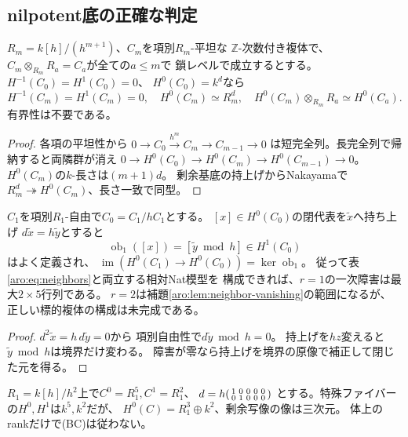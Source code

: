 \subsection{nilpotent底の正確な判定}
\begin{lemma}[隣接群消滅による自由な持上げ]\label{aro:lem:neighbor-vanishing}
$R_m=k[h]/(h^{m+1})$、$C_m$を項別$R_m$-平坦な
$\mathbb Z$-次数付き複体で、
$C_m\otimes_{R_m}R_a=C_a$が全ての$a\le m$で
鎖レベルで成立するとする。
$H^{-1}(C_0)=H^1(C_0)=0$、
$H^0(C_0)=k^d$なら
\[
H^{-1}(C_m)=H^1(C_m)=0,\quad
H^0(C_m)\simeq R_m^d,\quad
H^0(C_m)\otimes_{R_m}R_a\simeq H^0(C_a).
\tag{ARO3}\label{aro:eq:flat}
\]
有界性は不要である。
\end{lemma}
\begin{proof}
各項の平坦性から
$0\to C_0\xrightarrow{h^m}C_m\to C_{m-1}\to0$
は短完全列。長完全列で帰納すると両隣群が消え
$0\to H^0(C_0)\to H^0(C_m)\to H^0(C_{m-1})\to0$。
$H^0(C_m)$の$k$-長さは$(m+1)d$。
剰余基底の持上げからNakayamaで
$R_m^d\twoheadrightarrow H^0(C_m)$、長さ一致で同型。
\end{proof}

\begin{proposition}[次数一の最初の障害行列]\label{aro:prop:first-obstruction}
$C_1$を項別$R_1$-自由で$C_0=C_1/hC_1$とする。
$[x]\in H^0(C_0)$の閉代表を$\widetilde x$へ持ち上げ
$d\widetilde x=h\widetilde y$とすると
\[
\operatorname{ob}_1([x])
=[\widetilde y\bmod h]\in H^1(C_0)
\tag{ARO4}\label{aro:eq:obstruction}
\]
はよく定義され、
$\operatorname{im}(H^0(C_1)\to H^0(C_0))
=\ker\operatorname{ob}_1$。
従って表\eqref{aro:eq:neighbors}と両立する相対Nat模型を
構成できれば、$r=1$の一次障害は最大$2\times5$行列である。
$r=2$は補題\ref{aro:lem:neighbor-vanishing}の範囲になるが、
正しい標的複体の構成は未完成である。
\end{proposition}
\begin{proof}
$d^2\widetilde x=h\,d\widetilde y=0$から
項別自由性で$d\widetilde y\bmod h=0$。
持上げを$hz$変えると$\widetilde y\bmod h$は境界だけ変わる。
障害が零なら持上げを境界の原像で補正して閉じた元を得る。
\end{proof}
\begin{example}[非零障害]\label{aro:ex:obstruction}
$R_1=k[h]/h^2$上で$C^0=R_1^5,C^1=R_1^2$、
$d=h\begin{psmallmatrix}1&0&0&0&0\\0&1&0&0&0\end{psmallmatrix}$
とする。特殊ファイバーの$H^0,H^1$は$k^5,k^2$だが、
$H^0(C)=R_1^3\oplus k^2$、剰余写像の像は三次元。
体上のrankだけで(BC)は従わない。
\end{example}

